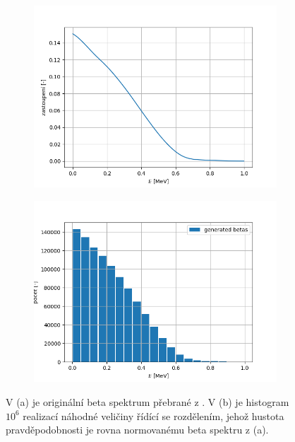 \documentclass[11pt,a4paper]{article}
\begin{document}
\begin{figure}[H]
	\centering
	\begin{subfigure}{0.49\textwidth}
		\centering
		\includegraphics[width=.99\textwidth]{betaSpektrum_Pb.png}
		\caption{}
	\end{subfigure}
	\begin{subfigure}{0.49\textwidth}
		\centering
		\includegraphics[width=.99\textwidth]{betaNahodnaCisla_Pb.png}
		\caption{}
	\end{subfigure}
\caption{V (a) je originální beta spektrum  přebrané z \cite{betaSpektrum}. V (b) je histogram $10^6$ realizací náhodné veličiny řídící se rozdělením, jehož hustota pravděpodobnosti je rovna normovanému beta spektru z (a).}
\label{fig:betaSpektrum_214Pb}
\end{figure}
\end{document}
